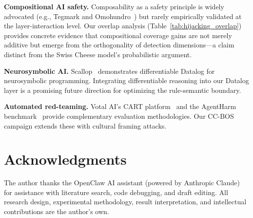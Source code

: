 \documentclass[conference]{IEEEtran}
\begin{document}
\textbf{Compositional AI safety.} Composability as a safety principle is widely advocated (e.g., Tegmark and Omohundro~\cite{tegmark2023provably}) but rarely empirically validated at the layer-interaction level. Our overlap analysis (Table~\ref{tab:hijacking_overlap}) provides concrete evidence that compositional coverage gains are not merely additive but emerge from the orthogonality of detection dimensions---a claim distinct from the Swiss Cheese model's probabilistic argument.

\textbf{Neurosymbolic AI.} Scallop~\cite{li2023scallop} demonstrates differentiable Datalog for neurosymbolic programming. Integrating differentiable reasoning into our Datalog layer is a promising future direction for optimizing the rule-semantic boundary.

\textbf{Automated red-teaming.} Votal AI's CART platform~\cite{votalai2026cart} and the AgentHarm benchmark~\cite{andriushchenko2025agentharm} provide complementary evaluation methodologies. Our CC-BOS campaign extends these with cultural framing attacks.


\balance

\section*{Acknowledgments}
The author thanks the OpenClaw AI assistant (powered by Anthropic Claude) for assistance with literature search, code debugging, and draft editing. All research design, experimental methodology, result interpretation, and intellectual contributions are the author's own.


\end{document}
